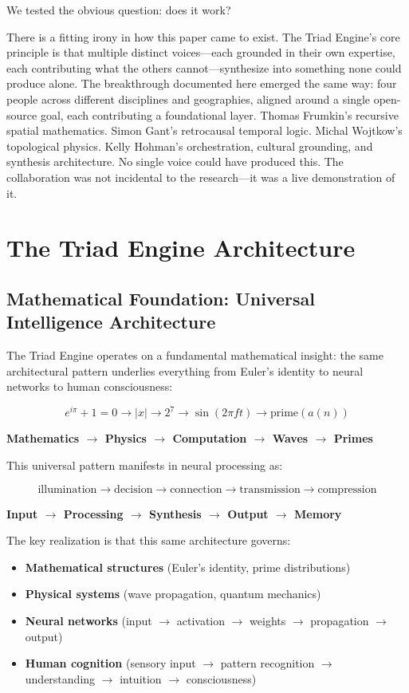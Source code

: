 \documentclass[11pt,a4paper]{article}
\begin{document}
We tested the obvious question: does it work?

There is a fitting irony in how this paper came to exist. The Triad Engine's
core principle is that multiple distinct voices---each grounded in their own
expertise, each contributing what the others cannot---synthesize into something
none could produce alone. The breakthrough documented here emerged the same
way: four people across different disciplines and geographies, aligned around
a single open-source goal, each contributing a foundational layer. Thomas
Frumkin's recursive spatial mathematics. Simon Gant's retrocausal temporal
logic. Michal Wojtkow's topological physics. Kelly Hohman's orchestration,
cultural grounding, and synthesis architecture. No single voice could have
produced this. The collaboration was not incidental to the research---it was a
live demonstration of it.

\section{The Triad Engine Architecture}

\subsection{Mathematical Foundation: Universal Intelligence Architecture}

The Triad Engine operates on a fundamental mathematical insight: the same architectural pattern underlies everything from Euler's identity to neural networks to human consciousness:

\[
e^{i\pi}+1=0 \rightarrow |x| \rightarrow 2^{7} \rightarrow \sin(2\pi f t) \rightarrow \text{prime}(a(n))
\]

\textbf{Mathematics $\rightarrow$ Physics $\rightarrow$ Computation $\rightarrow$ Waves $\rightarrow$ Primes}

This universal pattern manifests in neural processing as:

\[
\text{illumination} \rightarrow \text{decision} \rightarrow \text{connection} \rightarrow \text{transmission} \rightarrow \text{compression}
\]

\textbf{Input $\rightarrow$ Processing $\rightarrow$ Synthesis $\rightarrow$ Output $\rightarrow$ Memory}

The key realization is that this same architecture governs:
\begin{itemize}
  \item \textbf{Mathematical structures} (Euler's identity, prime distributions)
  \item \textbf{Physical systems} (wave propagation, quantum mechanics)
  \item \textbf{Neural networks} (input $\rightarrow$ activation $\rightarrow$ weights $\rightarrow$ propagation $\rightarrow$ output)
  \item \textbf{Human cognition} (sensory input $\rightarrow$ pattern recognition $\rightarrow$ understanding $\rightarrow$ intuition $\rightarrow$ consciousness)
\end{itemize}
\end{document}
